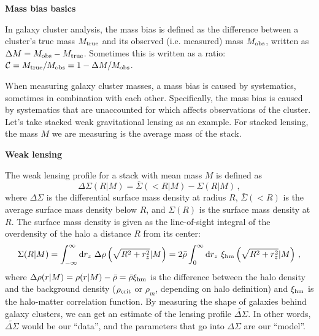 \documentclass[12pt]{article}
\newcommand{\wds}{\widetilde{\Delta\Sigma}}
\newcommand{\ds}{\Delta\Sigma}
\begin{document}
\noindent
{\bf Mass bias basics}

In galaxy cluster analysis, the mass bias is defined as the difference between a cluster's true mass $M_{\rm true}$ and its observed (i.e. measured) mass $M_{\rm obs}$, written as $\Delta M = M_{\rm obs}-M_{\rm true}$. Sometimes this is written as a ratio: $\mathcal{C} = M_{\rm true}/M_{\rm obs} = 1-\Delta M/M_{\rm obs}$.

When measuring galaxy cluster masses, a mass bias is caused by systematics, sometimes in combination with each other. Specifically, the mass bias is caused by systematics that are unaccounted for which affects observations of the cluster. Let's take stacked weak gravitational lensing as an example. For stacked lensing, the mass $M$ we are measuring is the average mass of the stack.

\vspace{12pt}
\noindent
{\bf Weak lensing}

The weak lensing profile for a stack with mean mass $M$ is defined as 
%
\begin{equation}
	\label{eq:deltasigma_def}
	\Delta\Sigma(R|M) = \bar{\Sigma}(<R|M) - \Sigma(R|M)\,,
\end{equation}
%
where $\Delta\Sigma$ is the differential surface mass density at radius $R$, $\bar{\Sigma}(<R)$ is the average surface mass density below $R$, and $\Sigma(R)$ is the surface mass density at $R$. The surface mass density is given as the line-of-sight integral of the overdensity of the halo a distance $R$ from its center:
%
\begin{equation}
	\label{eq:sigma_def}
	\Sigma(R|M) = \int_{-\infty}^{\infty} {\rm d}r_z\ \Delta\rho\left(\sqrt{R^2+r_z^2}|M\right) = 2\bar{\rho}\int_0^\infty {\rm d}r_z\ \xi_{\rm hm}\left(\sqrt{R^2+r_z^2}|M\right)\,,
\end{equation}
%
where $\Delta\rho(r|M) = \rho(r|M) - \bar{\rho} = \bar{\rho}\xi_{\rm hm}$ is the difference between the halo density and the background density ($\rho_{\rm crit}$ or $\rho_{m}$, depending on halo definition) and $\xi_{\rm hm}$ is the halo-matter correlation function. By measuring the shape of galaxies behind galaxy clusters, we can get an estimate of the lensing profile $\wds$. In other words, $\wds$ would be our ``data'', and the parameters that go into $\ds$ are our ``model''.
\end{document}
